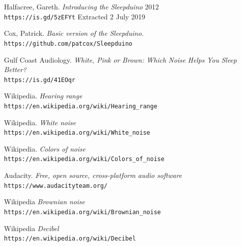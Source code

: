 \documentclass[a4paper,10pt]{article}
\begin{document}
\begin{thebibliography}{9}
 
Halfacree, Gareth.
\textit{Introducing the Sleepduino}
2012 
\\\texttt{https://is.gd/5zEFYt}
Extracted 2 July 2019

 

Cox, Patrick.
\textit{Basic version of the Sleepduino.}
\\\texttt{https://github.com/patcox/Sleepduino}

Gulf Coast Audiology.
\textit{White, Pink or Brown: Which Noise Helps You Sleep Better?}
\\\texttt{https://is.gd/41EOqr}

Wikipedia.
\textit{Hearing range}
\\\texttt{https://en.wikipedia.org/wiki/Hearing\_range}

Wikipedia.
\textit{White noise}
\\\texttt{https://en.wikipedia.org/wiki/White\_noise}

Wikipedia.
\textit{Colors of noise}
\\\texttt{https://en.wikipedia.org/wiki/Colors\_of\_noise}

Audacity.
\textit{Free, open source, cross-platform audio software}
\\\texttt{https://www.audacityteam.org/}

Wikipedia
\textit{Brownian noise}
\\\texttt{https://en.wikipedia.org/wiki/Brownian\_noise}

Wikipedia
\textit{Decibel}
\\\texttt{https://en.wikipedia.org/wiki/Decibel}

\end{thebibliography}
\end{document}
